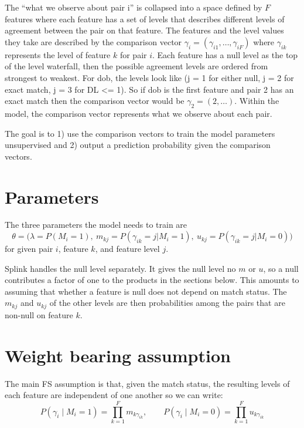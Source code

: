 \documentclass[11pt]{article}
\begin{document}
The ``what we observe about pair i'' is collapsed into a space defined by $F$ features where each feature has a set of levels that describes different levels of agreement between the pair on that feature. The features and the level values they take are described by the comparison vector $\gamma_i = (\gamma_{i1}, \dots , \gamma_{iF})$ where $\gamma_{ik}$ represents the level of feature $k$ for pair $i$. Each feature has a null level as the top of the level waterfall, then the possible agreement levels are ordered from strongest to weakest. For dob, the levels look like (j = 1 for either null, j = 2 for exact match, j = 3 for DL <= 1). So if dob is the first feature and pair 2 has an exact match then the comparison vector would be $\gamma_2 = (2, \dots)$. Within the model, the comparison vector represents what we observe about each pair.

The goal is to 1) use the comparison vectors to train the model parameters unsupervised and 2) output a prediction probability given the comparison vectors.

\section{Parameters}

The three parameters the model needs to train are
\[
\theta = \big(\lambda = P(M_i = 1),\ m_{kj} = P(\gamma_{ik} = j | M_i = 1),\ u_{kj} = P(\gamma_{ik} = j | M_i = 0)\big)
\]
for given pair $i$, feature $k$, and feature level $j$.

Splink handles the null level separately. It gives the null level no $m$ or $u$, so a null contributes a factor of one to the products in the sections below. This amounts to assuming that whether a feature is null does not depend on match status. The $m_{kj}$ and $u_{kj}$ of the other levels are then probabilities among the pairs that are non-null on feature $k$.

\section{Weight bearing assumption}

The main FS assumption is that, given the match status, the resulting levels of each feature are independent of one another so we can write:
\[
P(\gamma_i \mid M_i = 1) = \prod_{k=1}^{F} m_{k\gamma_{ik}}, \qquad
P(\gamma_i \mid M_i = 0) = \prod_{k=1}^{F} u_{k\gamma_{ik}}
\]
\end{document}
